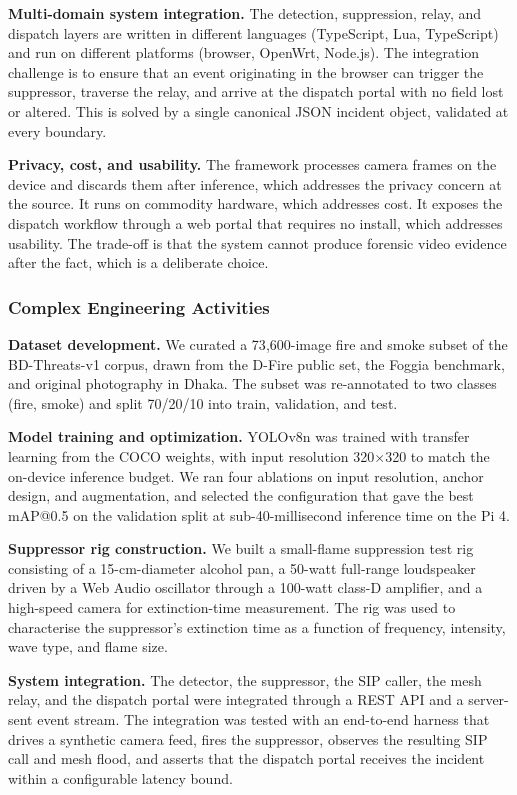 \textbf{Multi-domain system integration.} The detection, suppression, relay, and dispatch layers are written in different languages (TypeScript, Lua, TypeScript) and run on different platforms (browser, OpenWrt, Node.js). The integration challenge is to ensure that an event originating in the browser can trigger the suppressor, traverse the relay, and arrive at the dispatch portal with no field lost or altered. This is solved by a single canonical JSON incident object, validated at every boundary.

\textbf{Privacy, cost, and usability.} The framework processes camera frames on the device and discards them after inference, which addresses the privacy concern at the source. It runs on commodity hardware, which addresses cost. It exposes the dispatch workflow through a web portal that requires no install, which addresses usability. The trade-off is that the system cannot produce forensic video evidence after the fact, which is a deliberate choice.

\subsubsection{Complex Engineering Activities}

\textbf{Dataset development.} We curated a 73{,}600-image fire and smoke subset of the BD-Threats-v1 corpus, drawn from the D-Fire public set, the Foggia benchmark, and original photography in Dhaka. The subset was re-annotated to two classes (fire, smoke) and split 70/20/10 into train, validation, and test.

\textbf{Model training and optimization.} YOLOv8n was trained with transfer learning from the COCO weights, with input resolution 320$\times$320 to match the on-device inference budget. We ran four ablations on input resolution, anchor design, and augmentation, and selected the configuration that gave the best mAP@0.5 on the validation split at sub-40-millisecond inference time on the Pi 4.

\textbf{Suppressor rig construction.} We built a small-flame suppression test rig consisting of a 15-cm-diameter alcohol pan, a 50-watt full-range loudspeaker driven by a Web Audio oscillator through a 100-watt class-D amplifier, and a high-speed camera for extinction-time measurement. The rig was used to characterise the suppressor's extinction time as a function of frequency, intensity, wave type, and flame size.

\textbf{System integration.} The detector, the suppressor, the SIP caller, the mesh relay, and the dispatch portal were integrated through a REST API and a server-sent event stream. The integration was tested with an end-to-end harness that drives a synthetic camera feed, fires the suppressor, observes the resulting SIP call and mesh flood, and asserts that the dispatch portal receives the incident within a configurable latency bound.

